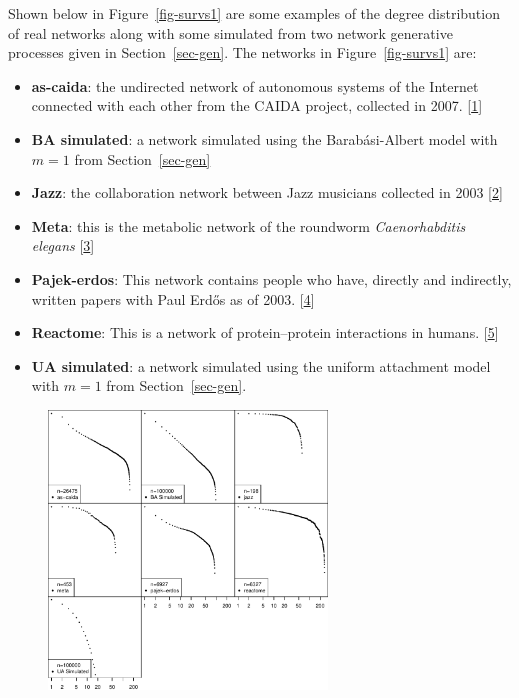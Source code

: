 \documentclass[
  10pt,
  a4paper,
]{scrreprt}
\providecommand{\tightlist}{%
  \setlength{\itemsep}{0pt}\setlength{\parskip}{0pt}}\usepackage{longtable,booktabs,array}
\theoremstyle{plain}
\theoremstyle{definition}
\theoremstyle{plain}
\theoremstyle{remark}
\begin{document}
{Shown below in Figure~\ref{fig-survs1} are some examples of the degree
distribution of real networks along with some simulated from two network
generative processes given in Section~\ref{sec-gen}. The networks in
Figure~\ref{fig-survs1} are:

\begin{itemize}
\tightlist
\item
  \textbf{as-caida}: the undirected network of autonomous systems of the
  Internet connected with each other from the CAIDA project, collected
  in 2007. {[}\protect\hyperlink{ref-caida}{1}{]}
\item
  \textbf{BA simulated}: a network simulated using the Barabási-Albert
  model with \(m=1\) from Section~\ref{sec-gen}
\item
  \textbf{Jazz}: the collaboration network between Jazz musicians
  collected in 2003 {[}\protect\hyperlink{ref-jazz}{2}{]}
\item
  \textbf{Meta}: this is the metabolic network of the roundworm
  \emph{Caenorhabditis elegans} {[}\protect\hyperlink{ref-meta}{3}{]}
\item
  \textbf{Pajek-erdos}: This network contains people who have, directly
  and indirectly, written papers with Paul Erdős as of 2003.
  {[}\protect\hyperlink{ref-pajek}{4}{]}
\item
  \textbf{Reactome}: This is a network of protein--protein interactions
  in humans. {[}\protect\hyperlink{ref-reactome}{5}{]}
\item
  \textbf{UA simulated}: a network simulated using the uniform
  attachment model with \(m=1\) from Section~\ref{sec-gen}.
\end{itemize}

\begin{figure}[H]

{\centering \includegraphics[width=0.66\textwidth,height=\textheight]{doc_files/figure-pdf/fig-survs1-1.pdf}

}
\end{figure}}
\end{document}
